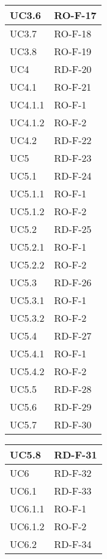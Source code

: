 \begin{center}
\begin{tabular}{ |m{8em}|m{13em}| }
    \hline
    UC3.6       &   RO-F-17 \\
    \hline
    UC3.7       &   RO-F-18 \\
    \hline
    UC3.8       &   RO-F-19 \\
    \hline
    UC4         &   RD-F-20 \\
    \hline
    UC4.1       &   RO-F-21 \\
    \hline
    UC4.1.1     &   RO-F-1 \\
    \hline
    UC4.1.2     &   RO-F-2 \\
    \hline
    UC4.2       &   RD-F-22 \\
    \hline
    UC5         &   RD-F-23 \\
    \hline
    UC5.1       &   RD-F-24 \\
    \hline
    UC5.1.1     &   RO-F-1 \\
    \hline
    UC5.1.2     &   RO-F-2 \\
    \hline
    UC5.2       &   RD-F-25 \\
    \hline
    UC5.2.1     &   RO-F-1 \\
    \hline
    UC5.2.2     &   RO-F-2 \\
    \hline
    UC5.3       &   RD-F-26 \\
    \hline
    UC5.3.1     &   RO-F-1 \\
    \hline
    UC5.3.2     &   RO-F-2 \\
    \hline
    UC5.4       &   RD-F-27 \\
    \hline
    UC5.4.1     &   RO-F-1 \\
    \hline
    UC5.4.2     &   RO-F-2 \\
    \hline
    UC5.5       &   RD-F-28 \\
    \hline
    UC5.6       &   RD-F-29 \\
    \hline
    UC5.7       &   RD-F-30 \\
    \hline
    \end{tabular}
    \newpage
    \begin{tabular}{ |m{8em}|m{13em}| }
    \hline
    UC5.8       &   RD-F-31 \\
    \hline
    UC6         &   RD-F-32 \\
    \hline
    UC6.1       &   RD-F-33 \\
    \hline
    UC6.1.1     &   RO-F-1 \\
    \hline
    UC6.1.2     &   RO-F-2 \\
    \hline
    UC6.2       &   RD-F-34 \\

\end{tabular}
\end{center}
